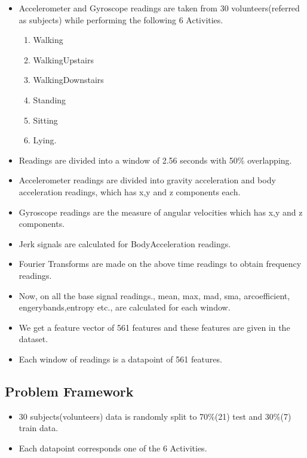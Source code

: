 \documentclass[11pt]{article}
\providecommand{\tightlist}{%
      \setlength{\itemsep}{0pt}\setlength{\parskip}{0pt}}
\begin{document}
    \begin{itemize}
\item
  Accelerometer and Gyroscope readings are taken from 30
  volunteers(referred as subjects) while performing the following 6
  Activities.

  \begin{enumerate}
  \def\labelenumi{\arabic{enumi}.}
  \tightlist
  \item
    Walking\\
  \item
    WalkingUpstairs
  \item
    WalkingDownstairs
  \item
    Standing
  \item
    Sitting
  \item
    Lying.
  \end{enumerate}
\item
  Readings are divided into a window of 2.56 seconds with 50\%
  overlapping.
\item
  Accelerometer readings are divided into gravity acceleration and body
  acceleration readings, which has x,y and z components each.
\item
  Gyroscope readings are the measure of angular velocities which has x,y
  and z components.
\item
  Jerk signals are calculated for BodyAcceleration readings.
\item
  Fourier Transforms are made on the above time readings to obtain
  frequency readings.
\item
  Now, on all the base signal readings., mean, max, mad, sma,
  arcoefficient, engerybands,entropy etc., are calculated for each
  window.
\item
  We get a feature vector of 561 features and these features are given
  in the dataset.
\item
  Each window of readings is a datapoint of 561 features.
\end{itemize}

\subsection{Problem Framework}\label{problem-framework}

\begin{itemize}
\tightlist
\item
  30 subjects(volunteers) data is randomly split to 70\%(21) test and
  30\%(7) train data.
\item
  Each datapoint corresponds one of the 6 Activities.
\end{itemize}
\end{document}

